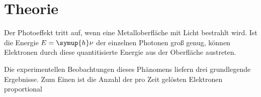 \section{Theorie}
\label{sec:Theorie}

Der Photoeffekt tritt auf, wenn eine Metalloberfläche mit Licht bestrahlt wird.
Ist die Energie $E=\symup{h}\nu$ der einzelnen Photonen groß genug, können Elektronen durch
diese quantitisierte Energie aus der Oberfläche austreten.

Die experimentellen Beobachtungen dieses Phänomens liefern drei grundlegende Ergebnisse.
Zum Einen ist die Anzahl der pro Zeit gelösten Elektronen proportional
